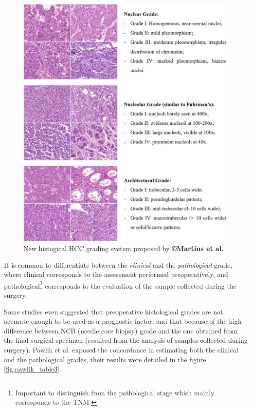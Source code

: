 \documentclass[]{article}
\begin{document}
\begin{figure}[th!]
\centering
\includegraphics[width=0.9\linewidth]{images/martins2017_fig5}
\caption{New histogical HCC grading system proposed by \textbf{©Martins et al. \cite{Martins2017}}}
\label{fig:martins2017_fig5}
\end{figure}


It is common to differentiate between the \emph{clinical} and the
\emph{pathological} grade, where clinical corresponds to the assessment
performed preoperatively, and pathological\footnote{Important to distinguish from the pathological stage which mainly corresponds to the TNM.} corresponds to the evaluation
of the sample collected during the surgery.

Some studies even suggested that preoperative histological grades are
not accurate enough to be used as a prognostic factor, and that because
of the high difference between NCB (needle core biopsy) grade and the
one obtained from the final surgical specimen (resulted from the
analysis of samples collected during surgery). Pawlik et al.
exposed the concordance in estimating both the clinical and the pathological grades, their results were detailed in the figure \ref{fig:pawlik_table3}.
\end{document}
